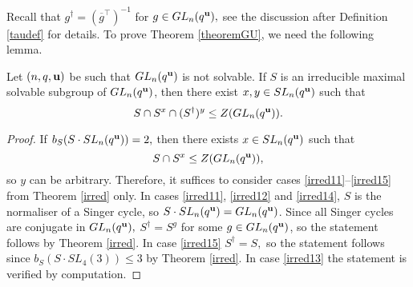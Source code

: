 Recall that $g^{\dagger}=(\overline{g}^{\top})^{-1}$ for $g \in GL_n(q^{\bf u}),$ see the discussion after Definition \ref{taudef} for details. To prove  Theorem \ref{theoremGU}, we need the following lemma.

\begin{Lem}\label{starc}
Let $(n,q, {\bf u})$ be such that $GL_n(q^{\bf u})$ is not solvable. If $S$ is an irreducible maximal solvable  subgroup of $GL_n(q^{\bf u})$, then there exist $x, y \in SL_n(q^{\bf u})$ such that $$S \cap S^x \cap (S^{\dagger})^y \le Z(GL_n(q^{\bf u})).$$
\end{Lem} 
\begin{proof}
If $b_S(S \cdot SL_n(q^{\bf u}))=2,$ then there exists $x \in SL_n(q^{\bf u})$ such that $$S \cap S^x \le Z(GL_n(q^{\bf u})),$$ so $y$ can be arbitrary. Therefore, it suffices to consider cases \eqref{irred11}--\eqref{irred15} from Theorem \ref{irred} only.
 In cases \eqref{irred11}, \eqref{irred12} and \eqref{irred14}, $S$ is the normaliser of a Singer cycle, so $S \cdot SL_n(q^{\bf u})=GL_n(q^{\bf u})$. Since all Singer cycles are conjugate in $GL_n(q^{\bf u}),$ $S^{\dagger}=S^g$ for some $g \in GL_n(q^{\bf u})$, so the statement follows by Theorem \ref{irred}. 
In  case \eqref{irred15} $S^{\dagger}=S,$ so the statement follows since $b_S(S \cdot SL_4(3))\le 3$ by Theorem \ref{irred}.
In  case \eqref{irred13} the statement is verified by computation.  
\end{proof}




